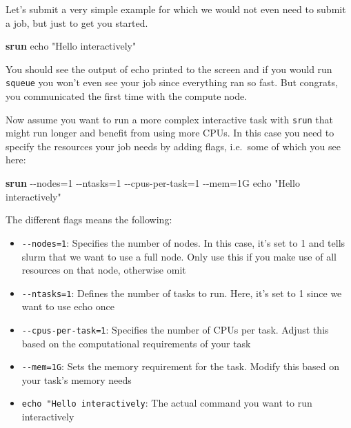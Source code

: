 \documentclass[
  letterpaper,
  DIV=11,
  numbers=noendperiod]{scrreprt}
\newenvironment{Shaded}{}{}
\newcommand{\AttributeTok}[1]{\textcolor[rgb]{0.84,0.23,0.29}{#1}}
\newcommand{\ExtensionTok}[1]{\textcolor[rgb]{0.84,0.23,0.29}{\textbf{#1}}}
\newcommand{\NormalTok}[1]{\textcolor[rgb]{0.14,0.16,0.18}{#1}}
\newcommand{\OperatorTok}[1]{\textcolor[rgb]{0.14,0.16,0.18}{#1}}
\newcommand{\StringTok}[1]{\textcolor[rgb]{0.01,0.18,0.38}{#1}}
\providecommand{\tightlist}{%
  \setlength{\itemsep}{0pt}\setlength{\parskip}{0pt}}\usepackage{longtable,booktabs,array}
\begin{document}
Let's submit a very simple example for which we would not even need to
submit a job, but just to get you started.

\begin{Shaded}
\begin{Highlighting}[]
\ExtensionTok{srun}\NormalTok{ echo }\StringTok{"Hello interactively"}
\end{Highlighting}
\end{Shaded}

You should see the output of echo printed to the screen and if you would
run \texttt{squeue} you won't even see your job since everything ran so
fast. But congrats, you communicated the first time with the compute
node.

Now assume you want to run a more complex interactive task with
\texttt{srun} that might run longer and benefit from using more CPUs. In
this case you need to specify the resources your job needs by adding
flags, i.e.~some of which you see here:

\begin{Shaded}
\begin{Highlighting}[]
\ExtensionTok{srun} \AttributeTok{{-}{-}nodes}\OperatorTok{=}\NormalTok{1 }\AttributeTok{{-}{-}ntasks}\OperatorTok{=}\NormalTok{1 }\AttributeTok{{-}{-}cpus{-}per{-}task}\OperatorTok{=}\NormalTok{1 }\AttributeTok{{-}{-}mem}\OperatorTok{=}\NormalTok{1G echo }\StringTok{"Hello interactively"}
\end{Highlighting}
\end{Shaded}

The different flags means the following:

\begin{itemize}
\tightlist
\item
  \texttt{-\/-nodes=1}: Specifies the number of nodes. In this case,
  it's set to 1 and tells slurm that we want to use a full node. Only
  use this if you make use of all resources on that node, otherwise omit
\item
  \texttt{-\/-ntasks=1}: Defines the number of tasks to run. Here, it's
  set to 1 since we want to use echo once
\item
  \texttt{-\/-cpus-per-task=1}: Specifies the number of CPUs per task.
  Adjust this based on the computational requirements of your task
\item
  \texttt{-\/-mem=1G}: Sets the memory requirement for the task. Modify
  this based on your task's memory needs
\item
  \texttt{echo\ "Hello\ interactively}: The actual command you want to
  run interactively
\end{itemize}
\end{document}
